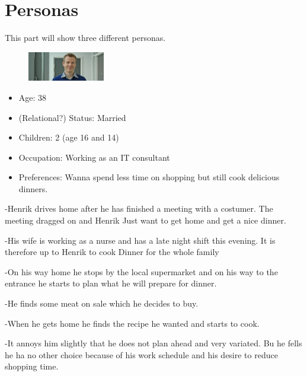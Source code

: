 \section{Personas}
This part will show three different personas.

\begin{figure}[H]
	\includegraphics[width=0.30\textwidth]{Grafik/FoodPlanner/PersonaHenrikJensen}
	\label{PersonaHenrikJensen}
\end{figure}
\begin{itemize}
	\item Age: 38
	\item (Relational?) Status: Married
	\item Children: 2 (age 16 and 14)
	\item Occupation: Working as an IT consultant
	\item Preferences: Wanna spend less time on shopping but still cook delicious dinners.
\end{itemize}
-Henrik drives home after he has finished a meeting with a costumer. The meeting dragged on and Henrik Just want to get home and get a nice dinner.

-His wife is working as a nurse and has a late night shift this evening. It is therefore up to Henrik to cook Dinner for the whole family

-On his way home he stops by the local supermarket and on his way to the entrance he starts to plan what he will prepare for dinner.

-He finds some meat on sale which he decides to buy.

-When he gets home he finds the recipe he wanted and starts to cook.

-It annoys him slightly that he does not plan ahead and very variated. Bu he fells he ha no other choice because of his work schedule and his desire to reduce shopping time.

